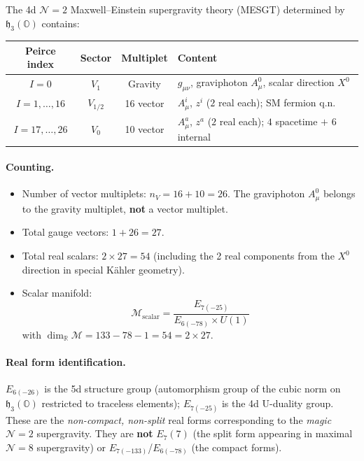 The 4d $\mathcal{N}=2$ Maxwell--Einstein supergravity theory (MESGT)
determined by $\mathfrak{h}_3(\mathbb{O})$ contains:

\begin{center}
\begin{tabular}{c|c|c|l}
\hline
\textbf{Peirce index} & \textbf{Sector} & \textbf{Multiplet} & \textbf{Content} \\
\hline
$I = 0$ & $V_1$ & Gravity &
  $g_{\mu\nu}$, graviphoton $A^0_\mu$, scalar direction $X^0$ \\
\hline
$I = 1, \ldots, 16$ & $V_{1/2}$ & 16 vector &
  $A^i_\mu$, $z^i$ ($2$ real each); SM fermion q.n.\ \\
\hline
$I = 17, \ldots, 26$ & $V_0$ & 10 vector &
  $A^a_\mu$, $z^a$ ($2$ real each); $4$ spacetime $+$ $6$ internal \\
\hline
\end{tabular}
\end{center}

\paragraph{Counting.}
\begin{itemize}
\item Number of vector multiplets: $n_V = 16 + 10 = 26$.
  The graviphoton $A^0_\mu$ belongs to the gravity multiplet, \textbf{not}
  a vector multiplet.
\item Total gauge vectors: $1 + 26 = 27$.
\item Total real scalars: $2 \times 27 = 54$
  (including the 2 real components from the $X^0$ direction in special
  K\"ahler geometry).
\item Scalar manifold:
\begin{equation}\tag{49.1}
  \mathcal{M}_{\mathrm{scalar}} =
  \frac{E_{7(-25)}}{E_{6(-78)} \times U(1)}
\end{equation}
  with $\dim_{\mathbb{R}} \mathcal{M} = 133 - 78 - 1 = 54 = 2 \times 27$.
\end{itemize}

\paragraph{Real form identification.}
$E_{6(-26)}$ is the 5d structure group (automorphism group of the cubic
norm on $\mathfrak{h}_3(\mathbb{O})$ restricted to traceless elements);
$E_{7(-25)}$ is the 4d U-duality group.
These are the \emph{non-compact, non-split} real forms corresponding
to the \emph{magic} $\mathcal{N} = 2$ supergravity.
They are \textbf{not} $E_7(7)$ (the split form appearing in maximal
$\mathcal{N} = 8$ supergravity) or $E_{7(-133)}$/$E_{6(-78)}$
(the compact forms).

